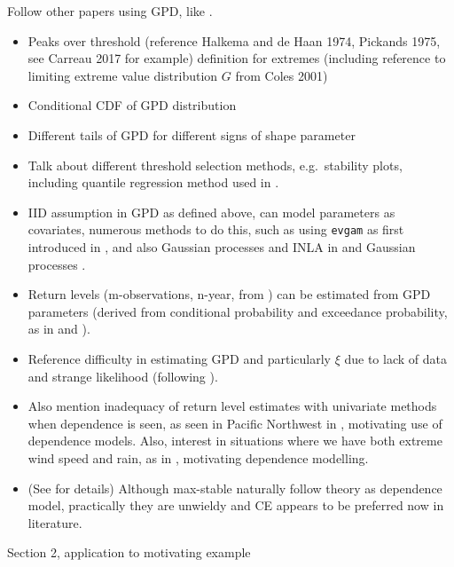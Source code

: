 \documentclass{article}
\numberwithin{equation}{section}
\begin{document}
Follow other papers using GPD, like \cite{Carreau2017}. 
\begin{itemize}
  \item Peaks over threshold (reference Halkema and de Haan 1974, Pickands 1975, see Carreau 2017 for example) definition for extremes (including reference to limiting extreme value distribution $G$ from Coles 2001)
  \item Conditional CDF of GPD distribution
  \item Different tails of GPD for different signs of shape parameter
  \item Talk about different threshold selection methods, e.g.\ stability plots, including quantile regression method used in \cite{Youngman2019}.
  \item IID assumption in GPD as defined above, can model parameters as covariates, numerous methods to do this, such as using \texttt{evgam} as first introduced in \cite{Youngman2019}, and also Gaussian processes and INLA in \cite{Opitz2018} and Gaussian processes .
  \item Return levels (m-observations, n-year, from \cite{Coles2001}) can be estimated from GPD parameters (derived from conditional probability and exceedance probability, as in \cite{Cooley2007} and \cite{Coles2001}). 
  \item Reference difficulty in estimating GPD and particularly $\xi$ due to lack of data and strange likelihood (following \cite{Coles2001}). 
  \item Also mention inadequacy of return level estimates with univariate methods when dependence is seen, as seen in Pacific Northwest in \cite{Zhang2024}, motivating use of dependence models. Also, interest in situations where we have both extreme wind speed and rain, as in \cite{Heffernan2004}, motivating dependence modelling. 
  \item (See \cite{Huser2024} for details) Although max-stable naturally follow theory as dependence model, practically they are unwieldy and CE appears to be preferred now in literature. 
\end{itemize}

Section 2, application to motivating example
\end{document}
